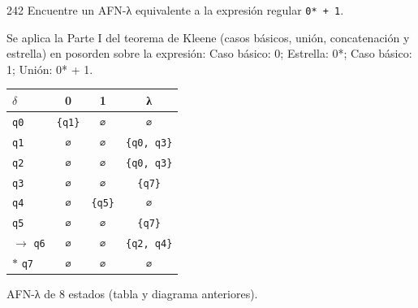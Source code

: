 \documentclass[11pt]{article}
\begin{document}
\begin{ejercicio}{242}{}
Encuentre un AFN-λ equivalente a la expresión regular \texttt{0* + 1}.
\end{ejercicio}
\proc Se aplica la Parte I del teorema de Kleene (casos básicos, unión, concatenación y estrella) en posorden sobre la expresión: Caso básico: 0; Estrella: 0*; Caso básico: 1; Unión: 0* + 1.
\begin{center}\small\begin{tabular}{lccc}\toprule
$\delta$ & 0 & 1 & λ \\\midrule
 \texttt{q0} & \texttt{\{q1\}} & \texttt{∅} & \texttt{∅} \\
 \texttt{q1} & \texttt{∅} & \texttt{∅} & \texttt{\{q0, q3\}} \\
 \texttt{q2} & \texttt{∅} & \texttt{∅} & \texttt{\{q0, q3\}} \\
 \texttt{q3} & \texttt{∅} & \texttt{∅} & \texttt{\{q7\}} \\
 \texttt{q4} & \texttt{∅} & \texttt{\{q5\}} & \texttt{∅} \\
 \texttt{q5} & \texttt{∅} & \texttt{∅} & \texttt{\{q7\}} \\
$\to$ \texttt{q6} & \texttt{∅} & \texttt{∅} & \texttt{\{q2, q4\}} \\
$*$ \texttt{q7} & \texttt{∅} & \texttt{∅} & \texttt{∅} \\
\bottomrule\end{tabular}\end{center}

\resp AFN-λ de 8 estados (tabla y diagrama anteriores).
\end{document}
